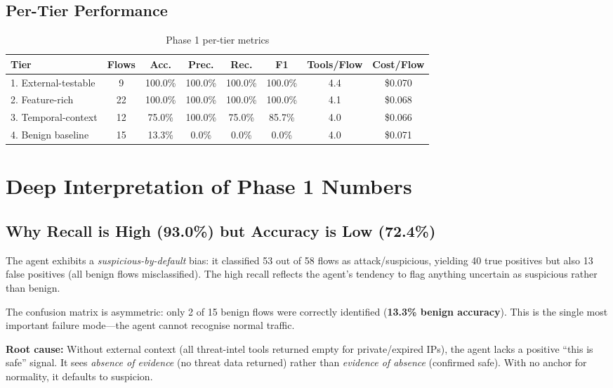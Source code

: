 \documentclass[12pt, a4paper, oneside]{report}
\newcommand{\metric}[1]{\textbf{#1}}
\begin{document}
\subsection{Per-Tier Performance}

\begin{table}[H]
\centering
\caption{Phase 1 per-tier metrics}
\label{tab:phase1-tiers}
\begin{tabular}{@{}lccccccc@{}}
\toprule
\textbf{Tier} & \textbf{Flows} & \textbf{Acc.} & \textbf{Prec.} & \textbf{Rec.}
  & \textbf{F1} & \textbf{Tools/Flow} & \textbf{Cost/Flow} \\
\midrule
1. External-testable  &  9 & 100.0\% & 100.0\% & 100.0\% & 100.0\% & 4.4 & \$0.070 \\
2. Feature-rich       & 22 & 100.0\% & 100.0\% & 100.0\% & 100.0\% & 4.1 & \$0.068 \\
3. Temporal-context   & 12 &  75.0\% & 100.0\% &  75.0\% &  85.7\% & 4.0 & \$0.066 \\
4. Benign baseline    & 15 &  13.3\% &   0.0\% &   0.0\% &   0.0\% & 4.0 & \$0.071 \\
\bottomrule
\end{tabular}
\end{table}


\section{Deep Interpretation of Phase 1 Numbers}
\label{sec:phase1-interpretation}

\subsection{Why Recall is High (93.0\%) but Accuracy is Low (72.4\%)}

The agent exhibits a \emph{suspicious-by-default} bias: it classified 53 out of 58
flows as attack/suspicious, yielding 40 true positives but also 13 false positives
(all benign flows misclassified). The high recall reflects the agent's tendency to
flag anything uncertain as suspicious rather than benign.

The confusion matrix is asymmetric: only 2 of 15 benign flows were correctly
identified (\metric{13.3\% benign accuracy}). This is the single most important
failure mode---the agent cannot recognise normal traffic.

\textbf{Root cause:} Without external context (all threat-intel tools returned
empty for private/expired IPs), the agent lacks a positive ``this is safe'' signal.
It sees \emph{absence of evidence} (no threat data returned) rather than
\emph{evidence of absence} (confirmed safe). With no anchor for normality, it
defaults to suspicion.
\end{document}
